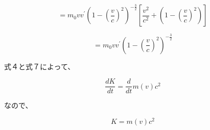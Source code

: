 \documentclass[xelatex,ja=standard,jafont=noto]{bxjsarticle}
\begin{document}
\begin{equation}
=m_{0}vv^{'}(1-(\frac{v}{c})^{2})^{-\frac{3}{2}}[\frac{v^{2}}{c^{2}}+(1-(\frac{v}{c})^{2})]    
\end{equation}

\begin{equation}
    =m_{0}vv^{'}(1-(\frac{v}{c})^{2})^{-\frac{3}{2}}
\end{equation}

式４と式７によって、

\begin{equation}
    \frac{dK}{dt}=\frac{d}{dt}m(v)c^{2}
\end{equation}

なので、

\begin{equation}
    K=m(v)c^{2}
\end{equation}
\end{document}

